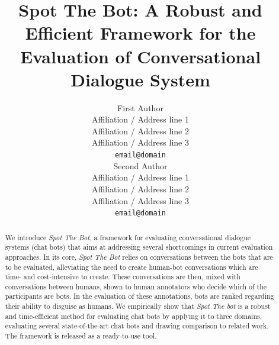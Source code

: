 \documentclass[11pt,a4paper]{article}
\title{Spot The Bot: A Robust and Efficient Framework for the Evaluation of Conversational Dialogue System}
\author{First Author \\
  Affiliation / Address line 1 \\
  Affiliation / Address line 2 \\
  Affiliation / Address line 3 \\
  \texttt{email@domain} \\\And
  Second Author \\
  Affiliation / Address line 1 \\
  Affiliation / Address line 2 \\
  Affiliation / Address line 3 \\
  \texttt{email@domain} \\}
\date{}
\begin{document}
\maketitle
\begin{abstract}
We introduce \emph{Spot The Bot}, a framework for evaluating conversational dialogue systems (chat bots) that aims at addressing several shortcomings in current evaluation approaches. In its core, \emph{Spot The Bot} relies on conversations between the bots that are to be evaluated, alleviating the need to create human-bot conversations which are time- and cost-intensive to create. 
These conversations are then, mixed with conversations between humans, shown to human annotators who decide which of the participants are bots. In the evaluation of these annotations, bots are ranked regarding their ability to disguise as humans. We empirically show that \emph{Spot The bot} is a robust and time-efficient method for evaluating chat bots by applying it to three domains, evaluating several state-of-the-art chat bots and drawing comparison to related work. The framework is released as a ready-to-use tool.
\end{abstract}
\end{document}
